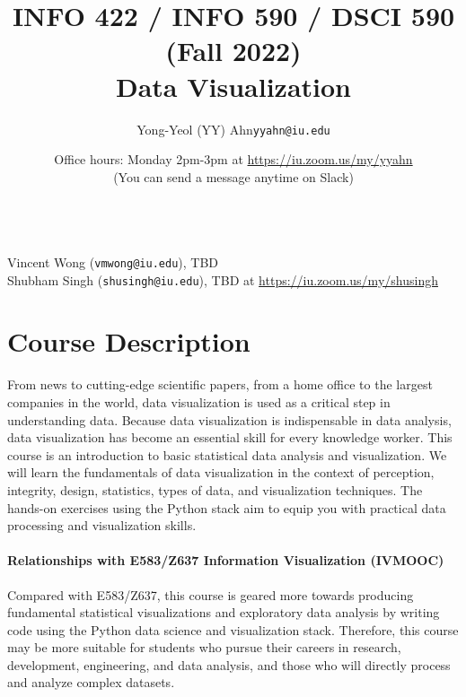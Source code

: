 \documentclass[11pt,article,oneside]{memoir} %
\makeatletter
\def\myauthor{Author}
\def\mytitle{Title}
\def\myaddress{\url{https://iu.zoom.us/my/yyahn}}
\def\myemail{yyahn@iu.edu}
\def\myauthor{Yong-Yeol (YY) Ahn}
\def\mytitle{{\normalsize INFO 422 / INFO 590 / DSCI 590 (Fall 2022)} \\ \HUGE{} Data Visualization}
\makeatother
\begin{document}

\title{\LARGE \mytitle} %
\author{\Large\myauthor\newline \footnotesize\texttt{\noindent\myemail } }
\date{Office hours: Monday 2pm-3pm at \myaddress \\(You can send a message anytime on Slack)}


\maketitle 

\vspace{-20pt}{\bfseries Assistant Instructors} \\ %
Vincent Wong (\texttt{vmwong@iu.edu}), TBD\\
Shubham Singh (\texttt{shusingh@iu.edu}), TBD at \url{https://iu.zoom.us/my/shusingh}\\


\section{Course Description}%

From news to cutting-edge scientific papers, from a home office to the largest companies in the world, data visualization is used as a critical step in understanding data. 
Because data visualization is indispensable in data analysis, data visualization has become an essential skill for every knowledge worker.  
This course is an introduction to basic statistical data analysis and visualization.  
We will learn the fundamentals of data visualization in the context of perception, integrity, design, statistics, types of data, and visualization techniques.  
The hands-on exercises using the Python stack aim to equip you with practical data processing and visualization skills. 

\paragraph{Relationships with E583/Z637 Information Visualization (IVMOOC)} Compared with E583/Z637, this course is geared more towards producing fundamental statistical visualizations and exploratory data analysis by writing code using the Python data science and visualization stack.  
Therefore, this course may be more suitable for students who pursue their careers in research, development, engineering, and data analysis, and those who will directly process and analyze complex datasets. 
\end{document}
